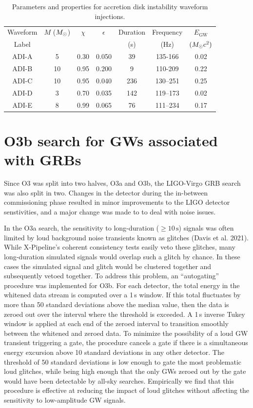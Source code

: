 \begin{table}[h!]
	\centering
	\caption
  {Parameters and properties for accretion disk instability waveform injections.
  \label{tab:adi}}
	\begin{tabular}{c c c c c c c}
		\hline
		Waveform & $M$ ($M_{\odot}$) & $\chi$ & $\epsilon$ & Duration & Frequency & $E_{\text{GW}}$ \\
		Label &  &  &  & (s) & (Hz) & $(M_{\odot} c^2)$ \\
		\hline
  	\hline
    ADI-A & 5 & 0.30 & 0.050 & 39 & 135-166 & 0.02 \\
    ADI-B & 10 & 0.95 & 0.200 & 9 & 110-209 & 0.22 \\
    ADI-C & 10 & 0.95 & 0.040 & 236 & 130–251 & 0.25 \\
    ADI-D & 3 & 0.70 & 0.035 & 142 & 119–173 & 0.02 \\
    ADI-E & 8 & 0.99 & 0.065 & 76 & 111–234 & 0.17 \\
		\hline
	\end{tabular}
\end{table}

\section{O3b search for GWs associated with GRBs}\label{sec:grb-o3b}

Since \ac{O3} was split into two halves, O3a and O3b, the \ac{LIGO}-Virgo \ac{GRB} search was also split in two.
Changes in the detector during the in-between commissioning phase resulted in minor improvements to the LIGO detector senstivities, and a major change was made to \xpip to deal with noise issues.

In the O3a search, the sensitivity to long-duration ($\geq 10\,\text{s}$) signals was often limited by loud background noise transients known as glitches (Davis et al. 2021).
While X-Pipeline's coherent consistency tests easily veto these glitches, many long-duration simulated signals would overlap such a glitch by chance.
In these cases the simulated signal and glitch would be clustered together and subsequently vetoed together.
To address this problem, an ``autogating'' procedure was implemented for O3b. For each detector, the total energy in the whitened data stream is computed over a 1\,s window.
If this total fluctuates by more than 50 standard deviations above the median value, then the data is zeroed out over the interval where the threshold is exceeded.
A 1\,s inverse Tukey window is applied at each end of the zeroed interval to transition smoothly between the whitened and zeroed data.
To minimize the possibility of a loud GW transient triggering a gate, the procedure cancels a gate if there is a simultaneous energy excursion above 10 standard deviations in any other detector.
The threshold of 50 standard deviations is low enough to gate the most problematic loud glitches, while being high enough that the only GWs zeroed out by the gate would have been detectable by all-sky searches.
Empirically we find that this procedure is effective at reducing the impact of loud glitches without affecting the sensitivity to low-amplitude GW signals.

